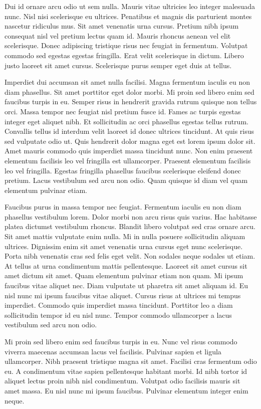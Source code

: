 \documentclass[11pt,a4paper]{article}
\begin{document}
Dui id ornare arcu odio ut sem nulla. Mauris vitae ultricies leo integer malesuada nunc. Nisl nisi scelerisque eu ultrices. Penatibus et magnis dis parturient montes nascetur ridiculus mus. Sit amet venenatis urna cursus. Pretium nibh ipsum consequat nisl vel pretium lectus quam id. Mauris rhoncus aenean vel elit scelerisque. Donec adipiscing tristique risus nec feugiat in fermentum. Volutpat commodo sed egestas egestas fringilla. Erat velit scelerisque in dictum. Libero justo laoreet sit amet cursus. Scelerisque purus semper eget duis at tellus.

Imperdiet dui accumsan sit amet nulla facilisi. Magna fermentum iaculis eu non diam phasellus. Sit amet porttitor eget dolor morbi. Mi proin sed libero enim sed faucibus turpis in eu. Semper risus in hendrerit gravida rutrum quisque non tellus orci. Massa tempor nec feugiat nisl pretium fusce id. Fames ac turpis egestas integer eget aliquet nibh. Et sollicitudin ac orci phasellus egestas tellus rutrum. Convallis tellus id interdum velit laoreet id donec ultrices tincidunt. At quis risus sed vulputate odio ut. Quis hendrerit dolor magna eget est lorem ipsum dolor sit. Amet mauris commodo quis imperdiet massa tincidunt nunc. Non enim praesent elementum facilisis leo vel fringilla est ullamcorper. Praesent elementum facilisis leo vel fringilla. Egestas fringilla phasellus faucibus scelerisque eleifend donec pretium. Lacus vestibulum sed arcu non odio. Quam quisque id diam vel quam elementum pulvinar etiam.

Faucibus purus in massa tempor nec feugiat. Fermentum iaculis eu non diam phasellus vestibulum lorem. Dolor morbi non arcu risus quis varius. Hac habitasse platea dictumst vestibulum rhoncus. Blandit libero volutpat sed cras ornare arcu. Sit amet mattis vulputate enim nulla. Mi in nulla posuere sollicitudin aliquam ultrices. Dignissim enim sit amet venenatis urna cursus eget nunc scelerisque. Porta nibh venenatis cras sed felis eget velit. Non sodales neque sodales ut etiam. At tellus at urna condimentum mattis pellentesque. Laoreet sit amet cursus sit amet dictum sit amet. Quam elementum pulvinar etiam non quam. Mi ipsum faucibus vitae aliquet nec. Diam vulputate ut pharetra sit amet aliquam id. Eu nisl nunc mi ipsum faucibus vitae aliquet. Cursus risus at ultrices mi tempus imperdiet. Commodo quis imperdiet massa tincidunt. Porttitor leo a diam sollicitudin tempor id eu nisl nunc. Tempor commodo ullamcorper a lacus vestibulum sed arcu non odio.

Mi proin sed libero enim sed faucibus turpis in eu. Nunc vel risus commodo viverra maecenas accumsan lacus vel facilisis. Pulvinar sapien et ligula ullamcorper. Nibh praesent tristique magna sit amet. Facilisi cras fermentum odio eu. A condimentum vitae sapien pellentesque habitant morbi. Id nibh tortor id aliquet lectus proin nibh nisl condimentum. Volutpat odio facilisis mauris sit amet massa. Eu nisl nunc mi ipsum faucibus. Pulvinar elementum integer enim neque.
\end{document}
